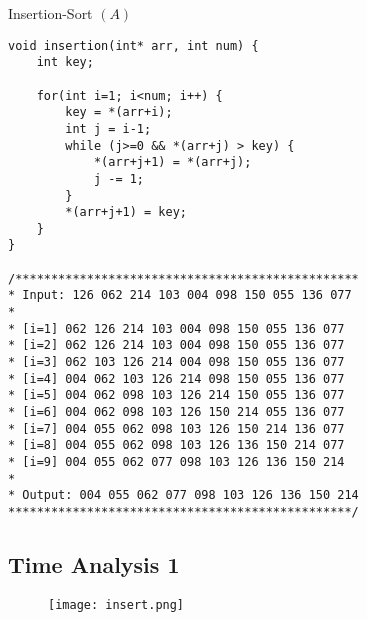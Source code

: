 \documentclass[12pt,openany]{book}
\theoremstyle{definition}
\begin{document}
	\begin{algorithm}[H]
		\caption{Insertion-Sort $(A)$}
		\BlankLine
		\BlankLine
	\end{algorithm}
	\begin{lstlisting}[style=C]
void insertion(int* arr, int num) {
	int key;
	
	for(int i=1; i<num; i++) {
		key = *(arr+i);
		int j = i-1;
		while (j>=0 && *(arr+j) > key) {
			*(arr+j+1) = *(arr+j);
			j -= 1;
		}
		*(arr+j+1) = key;
	}
}

/************************************************
* Input: 126 062 214 103 004 098 150 055 136 077 
* 
* [i=1] 062 126 214 103 004 098 150 055 136 077 
* [i=2] 062 126 214 103 004 098 150 055 136 077 
* [i=3] 062 103 126 214 004 098 150 055 136 077 
* [i=4] 004 062 103 126 214 098 150 055 136 077 
* [i=5] 004 062 098 103 126 214 150 055 136 077 
* [i=6] 004 062 098 103 126 150 214 055 136 077 
* [i=7] 004 055 062 098 103 126 150 214 136 077 
* [i=8] 004 055 062 098 103 126 136 150 214 077 
* [i=9] 004 055 062 077 098 103 126 136 150 214 
* 
* Output: 004 055 062 077 098 103 126 136 150 214 
************************************************/
	\end{lstlisting}
	
	\subsection{Time Analysis 1}
	\begin{figure}[h!]
		\centering
		\texttt{[image: insert.png]}
	\end{figure}
	
\end{document}
